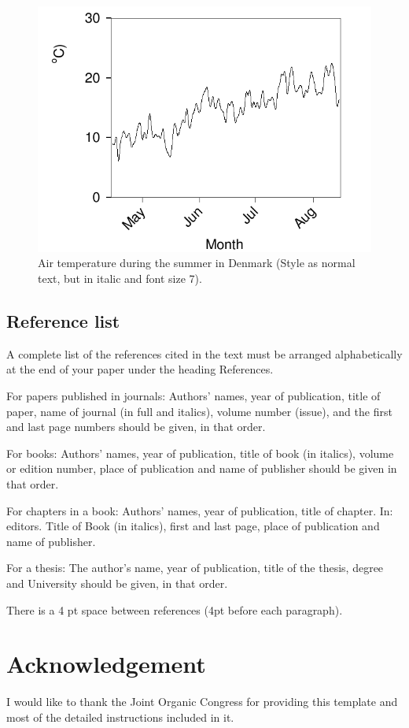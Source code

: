 \documentclass[english]{oegatb}
\begin{document}
\begin{figure}[H]
\includegraphics[width=0.9\columnwidth]{oegatb-ex.png}
\caption{Air temperature during the summer in Denmark
(Style as normal text, but in italic and font size 7).}
\end{figure}


\subsection{Reference list}
A complete list of the references cited in the text must be arranged
alphabetically at the end of your paper under the heading References.

For papers published in journals: Authors' names, year of publication,
title of paper, name of journal (in full and italics), volume number (issue),
and the first and last page numbers should be given, in that order.

For books: Authors' names, year of publication, title of book (in italics),
volume or edition number, place of publication and name of publisher
should be given in that order.

For chapters in a book: Authors' names, year of publication, title of chapter.
In: editors. Title of Book (in italics), first and last page,
place of publication and name of publisher.

For a thesis: The author's name, year of publication, title of the thesis,
degree and University should be given, in that order.

There is a 4 pt space between references (4pt before each paragraph).


\section{Acknowledgement}

I would like to thank the Joint Organic Congress for providing
this template and most of the detailed instructions included in it.

\nocite{*}

\end{document}
